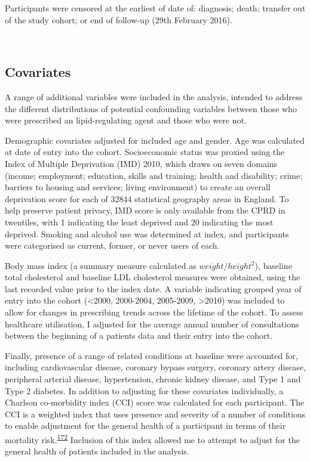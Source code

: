 \documentclass[a4paper, twoside]{templates/ociamthesis}
\begin{document}
Participants were censored at the earliest of date of: diagnosis; death; transfer out of the study cohort; or end of follow-up (29th February 2016).

~

\hypertarget{covariates}{%
\subsection{Covariates}\label{covariates}}

A range of additional variables were included in the analysis, intended to address the different distributions of potential confounding variables between those who were prescribed an lipid-regulating agent and those who were not.

Demographic covariates adjusted for included age and gender. Age was calculated at date of entry into the cohort. Socioeconomic status was proxied using the Index of Multiple Deprivation (IMD) 2010, which draws on seven domains (income; employment; education, skills and training; health and disability; crime; barriers to housing and services; living environment) to create an overall deprivation score for each of 32844 statistical geography areas in England. To help preserve patient privacy, IMD score is only available from the CPRD in twentiles, with 1 indicating the least deprived and 20 indicating the most deprived. Smoking and alcohol use was determined at index, and participants were categorised as current, former, or never users of each.

Body mass index (a summary measure calculated as \(weight/height^2\)), baseline total cholesterol and baseline LDL cholesterol measures were obtained, using the last recorded value prior to the index date. A variable indicating grouped year of entry into the cohort (\textless2000, 2000-2004, 2005-2009, \textgreater2010) was included to allow for changes in prescribing trends across the lifetime of the cohort. To assess healthcare utilisation, I adjusted for the average annual number of consultations between the beginning of a patients data and their entry into the cohort.

Finally, presence of a range of related conditions at baseline were accounted for, including cardiovascular disease, coronary bypass surgery, coronary artery disease, peripheral arterial disease, hypertension, chronic kidney disease, and Type 1 and Type 2 diabetes. In addition to adjusting for these covariates individually, a Charlson co-morbidity index (CCI) score was calculated for each participant. The CCI is a weighted index that uses presence and severity of a number of conditions to enable adjustment for the general health of a participant in terms of their mortality risk.\textsuperscript{\protect\hyperlink{ref-charlson1987new}{172}} Inclusion of this index allowed me to attempt to adjust for the general health of patients included in the analysis.
\end{document}
